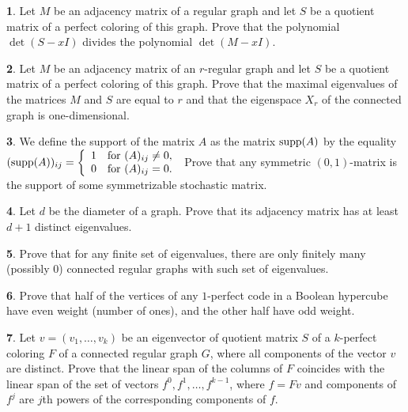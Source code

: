 \documentclass[11pt]{article}
\theoremstyle{definition}
\newtheorem{exercise}{\quad}
\newcommand{\supp}{{\rm supp}}
\begin{document}
\begin{exercise}
 Let $M$ be an adjacency matrix of a regular graph and let $S$ be a quotient matrix of a perfect coloring of this graph.
Prove that the polynomial $\det(S-xI)$ divides the polynomial $\det(M-xI)$. \end{exercise}

\begin{exercise}\label{exe8}
 Let $M$ be an adjacency matrix of an $r$-regular graph and let $S$ be a quotient matrix of a perfect coloring of this graph.
Prove that the maximal eigenvalues of the matrices $M$ and $S$
 are equal to $r$  and that the eigenspace $X_{r}$ of the {connected graph} is one-dimensional.
\end{exercise}

\begin{exercise}
We define the support of the matrix $A$ as the matrix $\supp(A)$ by the equality
$(\supp(A))_{ij}=\left\{
\begin{array}{ll}
1 & \mbox{for}\ (A)_{ij}\neq 0,\\
0 & \mbox{for}\ (A)_{ij}=0.
\end{array}
\right.$ Prove that any symmetric $(0,1)$-matrix
is the support of some symmetrizable stochastic matrix.
\end{exercise}

\begin{exercise}\label{exe13}
Let $d$ be the diameter of a graph. Prove that its adjacency matrix
has at least $d+1$ distinct eigenvalues.
\end{exercise}

\begin{exercise}
Prove that for any finite set of eigenvalues, there are only
finitely many (possibly $0$) connected regular graphs with such
set of eigenvalues.
\end{exercise}

\begin{exercise}
Prove that half of the vertices of any $1$-perfect code in a Boolean
hypercube have even weight (number of ones), and the other half have odd weight. \end{exercise}

\begin{exercise}
Let $v=(v_1,\dots,v_k)$ be an eigenvector of quotient matrix $S$ of a $k$-perfect coloring $F$ of a connected regular graph $G$, where all components of the vector $v$ are distinct. Prove
that the linear span of the columns of $F$ coincides with the linear
span of the set of vectors $f^0,f^1,\dots,f^{k-1}$, where $f=Fv$ and  components  of $f^j$ are $j$th powers of the corresponding  components  of $f$.
\end{exercise}
\end{document}
